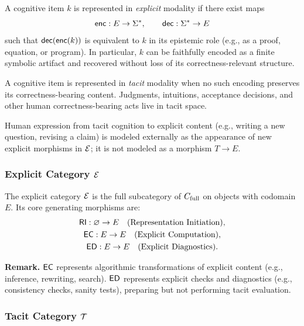 \begin{definition}
A cognitive item \(k\) is represented in \emph{explicit} modality if there exist
maps
\[
\mathsf{enc} : E \to \Sigma^{\ast}, \qquad
\mathsf{dec} : \Sigma^{\ast} \to E
\]
such that \(\mathsf{dec}(\mathsf{enc}(k))\) is equivalent to \(k\) in its epistemic role
(e.g., as a proof, equation, or program). In particular, \(k\) can be
faithfully encoded as a finite symbolic artifact and recovered without
loss of its correctness-relevant structure.
\end{definition}

\begin{definition}
A cognitive item is represented in \emph{tacit} modality when no such
encoding preserves its correctness-bearing content. Judgments, intuitions,
acceptance decisions, and other human correctness-bearing acts live in
tacit space.
\end{definition}

Human expression from tacit cognition to explicit content (e.g., writing a
new question, revising a claim) is modeled externally as the appearance of
new explicit morphisms in \(\mathcal{E}\); it is not modeled as a morphism
\(T \to E\).

\subsubsection{Explicit Category \texorpdfstring{\(\mathcal{E}\)}{E}}

\begin{definition}
The explicit category \(\mathcal{E}\) is the full subcategory of \(C_{\mathrm{full}}\)
on objects with codomain \(E\). Its core generating morphisms are:
\begin{gather*}
\mathsf{RI} : \varnothing \to E \quad\text{(Representation Initiation)},\\
\mathsf{EC} : E \to E \quad\text{(Explicit Computation)},\\
\mathsf{ED} : E \to E \quad\text{(Explicit Diagnostics)}.
\end{gather*}
\end{definition}

\noindent
\textbf{Remark.}
\(\mathsf{EC}\) represents algorithmic transformations of explicit content
(e.g., inference, rewriting, search). \(\mathsf{ED}\) represents explicit
checks and diagnostics (e.g., consistency checks, sanity tests),
preparing but not performing tacit evaluation.

\subsubsection{Tacit Category \texorpdfstring{\(\mathcal{T}\)}{T}}

